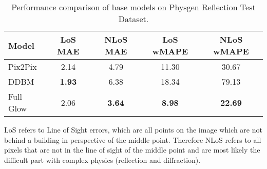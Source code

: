		\begin{table}[h!]
			\centering
			\begin{tabular}{|l|c|c|c|c|}
				\hline
				\textbf{Model} & \textbf{LoS MAE} & \textbf{NLoS MAE} & \textbf{LoS wMAPE} & \textbf{NLoS wMAPE} \\
				\hline
				Pix2Pix & 2.14 & 4.79 & 11.30 & 30.67 \\
				DDBM & \textbf{1.93} & 6.38 & 18.34 & 79.13 \\
				Full Glow & 2.06 & \textbf{3.64} & \textbf{8.98} & \textbf{22.69} \\
				\hline
			\end{tabular}
			\caption{Performance comparison of base models on Physgen Reflection Test Dataset.}
			\label{tab:performance_base}
		\end{table}
		
		LoS refers to Line of Sight errors, which are all points on the image which are not behind a building in perspective of the middle point. Therefore NLoS refers to all pixels that are not in the line of sight of the middle point and are most likely the difficult part with complex physics (reflection and diffraction).
		
		
		
		
		
		
		
		